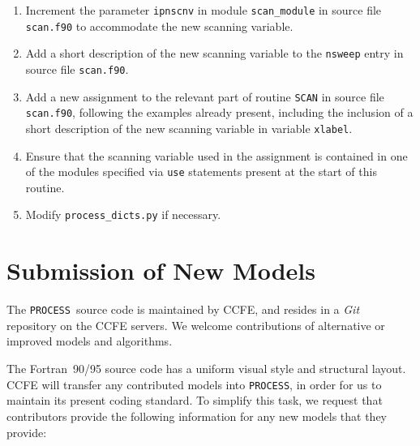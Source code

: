 \documentclass[11pt,a4paper]{report}
\newcommand{\process}{\mbox{\texttt{PROCESS}}}
\begin{document}
\begin{enumerate}

\item Increment the parameter \texttt{ipnscnv} in module \texttt{scan\_module}
  in source file \texttt{scan.f90} to accommodate the new scanning variable.

\item Add a short description of the new scanning variable to the
  \texttt{nsweep} entry in source file \texttt{scan.f90}.

\item Add a new assignment to the relevant part of routine \texttt{SCAN} in
  source file \texttt{scan.f90}, following the examples already present,
  including the inclusion of a short description of the new scanning variable
  in variable \texttt{xlabel}.

\item Ensure that the scanning variable used in the assignment is contained in
  one of the modules specified via \texttt{use} statements present at the
  start of this routine.

\item Modify \texttt{process\_dicts.py} if necessary.

\end{enumerate}

\section{Submission of New Models}

The \process\ source code is maintained by CCFE, and resides in a
\textit{Git}~\cite{git} repository on the CCFE servers. We welcome
contributions of alternative or improved models and algorithms.

The Fortran~90/95 source code has a uniform visual style and structural
layout. CCFE will transfer any contributed models into \process, in order for
us to maintain its present coding standard. To simplify this task, we request
that contributors provide the following information for any new models that
they provide:
\end{document}
